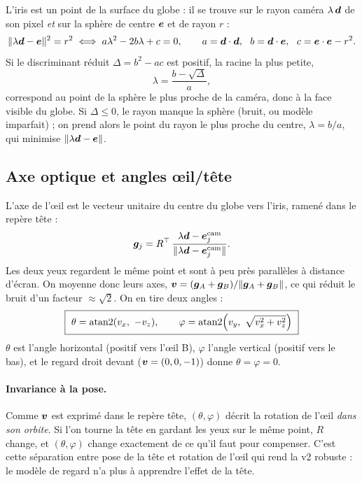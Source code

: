 L'iris est un point de la surface du globe : il se trouve sur le rayon caméra $\lambda\,\bm{d}$ de son pixel \emph{et} sur la sphère de centre $\bm{e}$ et de rayon $r$ :
\begin{equation}
  \|\lambda\bm{d} - \bm{e}\|^2 = r^2
  \iff a\lambda^2 - 2b\lambda + c = 0, \qquad a = \bm{d}\cdot\bm{d},\ \ b = \bm{d}\cdot\bm{e},\ \ c = \bm{e}\cdot\bm{e} - r^2 .
\end{equation}
Si le discriminant réduit $\Delta = b^2 - ac$ est positif, la racine la plus petite,
\begin{equation}
  \lambda = \frac{b - \sqrt{\Delta}}{a},
\end{equation}
correspond au point de la sphère le plus proche de la caméra, donc à la face visible du globe. Si $\Delta \leq 0$, le rayon manque la sphère (bruit, ou modèle imparfait) ; on prend alors le point du rayon le plus proche du centre, $\lambda = b/a$, qui minimise $\|\lambda\bm{d} - \bm{e}\|$.

\subsection{Axe optique et angles œil/tête}

L'axe de l'œil est le vecteur unitaire du centre du globe vers l'iris, ramené dans le repère tête :
\begin{equation}
  \bm{g}_j = R^{\top}\,\frac{\lambda\bm{d} - \bm{e}^\text{cam}_j}{\|\lambda\bm{d} - \bm{e}^\text{cam}_j\|} .
\end{equation}
Les deux yeux regardent le même point et sont à peu près parallèles à distance d'écran. On moyenne donc leurs axes, $\bm{v} = (\bm{g}_A + \bm{g}_B)/\|\bm{g}_A + \bm{g}_B\|$, ce qui réduit le bruit d'un facteur $\approx\sqrt2$. On en tire deux angles :
\begin{equation}
  \boxed{\ \theta = \operatorname{atan2}(v_x,\ -v_z), \qquad \varphi = \operatorname{atan2}\!\Big(v_y,\ \sqrt{v_x^2 + v_z^2}\Big)\ }
\end{equation}
$\theta$ est l'angle horizontal (positif vers l'œil B), $\varphi$ l'angle vertical (positif vers le bas), et le regard droit devant ($\bm{v} = (0,0,-1)$) donne $\theta = \varphi = 0$.

\paragraph{Invariance à la pose.} Comme $\bm{v}$ est exprimé dans le repère tête, $(\theta, \varphi)$ décrit la rotation de l'œil \emph{dans son orbite}. Si l'on tourne la tête en gardant les yeux sur le même point, $R$ change, et $(\theta, \varphi)$ change exactement de ce qu'il faut pour compenser. C'est cette séparation entre pose de la tête et rotation de l'œil qui rend la v2 robuste : le modèle de regard n'a plus à apprendre l'effet de la tête.

